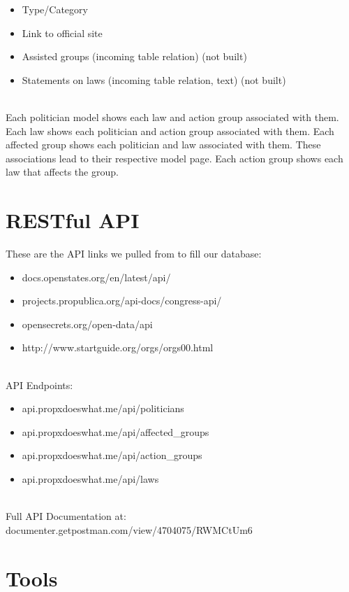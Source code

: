 \documentclass[12pt]{article}
\begin{document}
\begin{itemize}[label=]
\begin{itemize}
		\item Type/Category
		\item Link to official site
		\item Assisted groups (incoming table relation) (not built)
		\item Statements on laws (incoming table relation, text) (not built)
	\end{itemize} ~\\
	Each politician model shows each law and action group associated with them. Each law shows each politician and action group associated with them. Each affected group shows each politician and law associated with them. These associations lead to their respective model page. Each action group shows each law that affects the group.
\end{itemize}

\section{RESTful API}
These are the API links we pulled from to fill our database: \\

\begin{itemize}[label=-]
	\item docs.openstates.org/en/latest/api/
	\item projects.propublica.org/api-docs/congress-api/
	\item opensecrets.org/open-data/api
	\item http://www.startguide.org/orgs/orgs00.html
\end{itemize}

~\\
API Endpoints: \\

\begin{itemize}[label=-]
	\item api.propxdoeswhat.me/api/politicians
	\item api.propxdoeswhat.me/api/affected\_groups
	\item api.propxdoeswhat.me/api/action\_groups
	\item api.propxdoeswhat.me/api/laws
\end{itemize}

~\\
Full API Documentation at:\\ documenter.getpostman.com/view/4704075/RWMCtUm6

\section{Tools}
\end{document}
